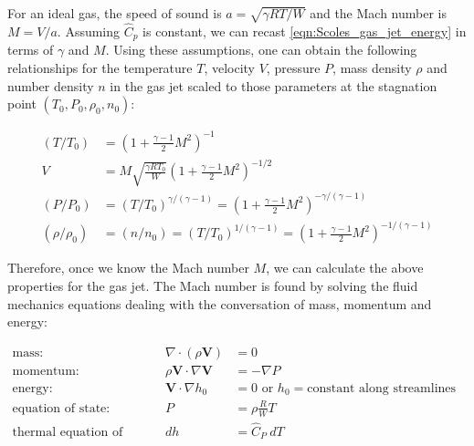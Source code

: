 For an ideal gas, the speed of sound is $a = \sqrt{\gamma R T/W}$ and the Mach number is $M = V/a$. Assuming $\hat{C}_p$ is constant, we can recast \cref{eqn:Scoles_gas_jet_energy} in terms of $\gamma$ and $M$.  Using these assumptions, one can obtain the following relationships for the temperature $T$, velocity $V$, pressure $P$, mass density $\rho$ and number density $n$ in the gas jet scaled to those parameters at the stagnation point $(T_0, P_0, \rho_0, n_0)$:

\begin{subequations}
\label{eqn:mach_properties}
\begin{align}
(T/T_0) &= \left(  1 + \frac{\gamma-1}{2} M^2 \right)^{-1} \label{eqn:gas_temp} \\
V &= M \sqrt{ \frac{\gamma R T_0}{W} } \left( 1 + \frac{\gamma-1}{2} M^2 \right)^{-1/2} \label{eqn:gas_velo} \\
(P/P_0) &= (T/T_0)^{\gamma/(\gamma-1)} = \left(  1 + \frac{\gamma-1}{2} M^2 \right)^{-\gamma/(\gamma-1)} \label{eqn:gas_pres} \\
(\rho/\rho_0) &= (n/n_0) = (T/T_0)^{1/(\gamma-1)} = \left(  1 + \frac{\gamma-1}{2} M^2 \right)^{-1/(\gamma-1)} \label{eqn:gas_dens}
\end{align}
\end{subequations}

Therefore, once we know the Mach number $M$, we can calculate the above properties for the gas jet. The Mach number is found by solving the fluid mechanics equations dealing with the conversation of mass, momentum and energy:

\begin{subequations}
\label{eqn:scoles_continuum}
\begin{flalign}
\text{mass:} && \nabla \cdot (\rho \mathbf{V}) &= 0 && \label{eqn:scoles_mass} \\
\text{momentum:} && \rho \mathbf{V} \cdot \nabla \mathbf{V} &= - \nabla P  && \label{eqn:scoles_momentum} \\
\text{energy:} && \mathbf{V} \cdot \nabla h_0 &= 0 \textrm{ or } h_0 = \textrm{constant along streamlines} \label{eqn:scoles_energy} && \\
\text{equation of state:} && P &= \rho \frac{R}{W} T  && \label{eqn:scoles_eqn-state} \\
\text{thermal equation of state:} && dh &= \hat{C}_P \ dT \label{eqn:scoles_thermal-eqn-state} && 
\end{flalign}
\end{subequations}

